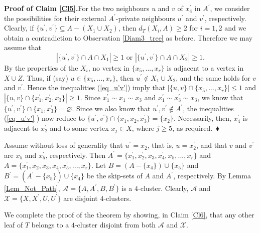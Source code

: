 \documentclass[12pt]{article}%
\begin{document}
\noindent\textbf{Proof of Claim \ref{Cl5}.\hspace{0.1in}}For the two
neighbours $u$ and $v$ of $x_{4}^{\prime}$ in $A^{\prime}$, we consider the
possibilities for their external $A^{\prime}$-private neighbours $u^{\prime}$
and $v^{\prime}$, respectively. Clearly, if $\{u^{\prime},v^{\prime
}\}\subseteq A-(X_{1}\cup X_{2})$, then $d_{T}(X_{i},A)\geq2$ for $i=1,2$ and
we obtain a contradiction to Observation \ref{Diam3_tree} as before. Therefore
we may assume that
\begin{equation}
|\{u^{\prime},v^{\prime}\}\cap A\cap X_{1}|\geq1\text{ \ or \ }|\{u^{\prime
},v^{\prime}\}\cap A\cap X_{2}|\geq1. \label{eq_u'v'}%
\end{equation}
By the properties of the $X_{i}$, no vertex in $\{x_{5},...,x_{r}\}$ is
adjacent to a vertex in $X\cup Z$. Thus, if (say) $u\in\{x_{5},...,x_{r}\}$,
then $u^{\prime}\notin X_{1}\cup X_{2}$, and the same holds for $v$ and
$v^{\prime}$. Hence the inequalities (\ref{eq_u'v'}) imply that $|\{u,v\}\cap
\{x_{5},...,x_{r}\}|\leq1$ and $|\{u,v\}\cap\{x_{1}^{\prime},x_{2}^{\prime
},x_{3}\}|\geq1$. Since $x_{1}^{\prime}\sim x_{1}\sim x_{3}$ and
$x_{1}^{\prime}\sim x_{3}^{\prime}\sim x_{3}$, we know that $\{u^{\prime
},v^{\prime}\}\cap\{x_{1},x_{3}^{\prime}\}=\varnothing$. Since we also know
that $u^{\prime},v^{\prime}\notin A^{\prime}$, the inequalities (\ref{eq_u'v'}%
) now reduce to $\{u^{\prime},v^{\prime}\}\cap\{x_{1},x_{2},x_{3}^{\prime
}\}=\{x_{2}\}$. Necessarily, then, $x_{4}^{\prime}$ is adjacent to
$x_{2}^{\prime}$ and to some vertex $x_{j}\in X$, where $j\geq5$, as
required.~$\blacklozenge$\medskip\ 

Assume without loss of generality that $u^{\prime}=x_{2}$, that is,
$u=x_{2}^{\prime}$, and that $v$ and $v^{\prime}$ are $x_{5}$ and
$x_{5}^{\prime}$, respectively. Then $A^{\prime}=\{x_{1}^{\prime}%
,x_{2}^{\prime},x_{3},x_{4}^{\prime},x_{5},...,x_{r}\}$ and $A=\{x_{1}%
^{\prime},x_{2},x_{3},x_{4},x_{5}^{\prime},...,x_{r}\}$. Let $B=(A-\{x_{4}%
\})\cup\{x_{5}\}$ and $B^{\prime}=(A^{\prime}-\{x_{5}\})\cup\{x_{4}\}$ be the
skip-sets of $A$ and $A^{\prime}$, respectively. By Lemma \ref{Lem_Not_Path},
$\mathcal{A}=\{A,A^{\prime},B,B^{\prime}\}$ is a $4$-cluster. Clearly,
$\mathcal{A}$ and $\mathcal{X}=\{X,X^{\prime},U,U^{\prime}\}$ are disjoint $4$-clusters.

We complete the proof of the theorem by showing, in Claim \ref{Cl6}, that any
other leaf of $T$ belongs to a $4$-cluster disjoint from both $\mathcal{A}$
and $\mathcal{X}$.
\end{document}
